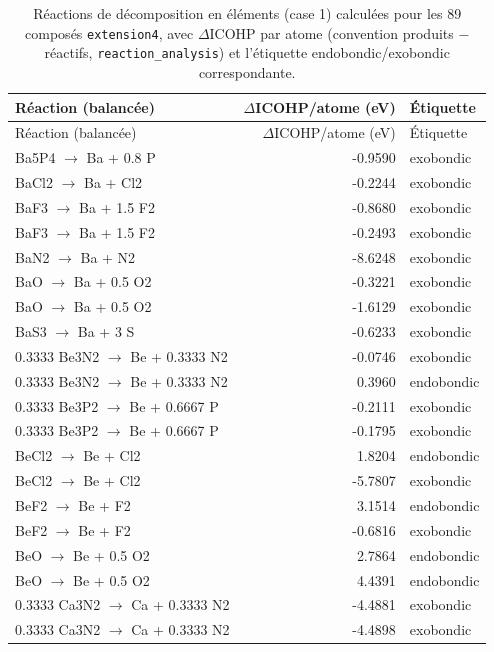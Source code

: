 \begin{longtable}{@{}lrl@{}}
\caption{Réactions de décomposition en éléments (case 1) calculées pour les 89 composés \texttt{extension4}, avec $\Delta$ICOHP par atome (convention produits $-$ réactifs, \texttt{reaction\_analysis}) et l'étiquette endobondic/exobondic correspondante.}\\
\toprule
Réaction (balancée) & $\Delta$ICOHP/atome (eV) & Étiquette \\
\midrule
\endfirsthead
\toprule
Réaction (balancée) & $\Delta$ICOHP/atome (eV) & Étiquette \\
\midrule
\endhead
\bottomrule
\endfoot
0.2 Ba5P4 $\rightarrow$ Ba + 0.8 P & -0.9590 & exobondic \\
BaCl2 $\rightarrow$ Ba + Cl2 & -0.2244 & exobondic \\
BaF3 $\rightarrow$ Ba + 1.5 F2 & -0.8680 & exobondic \\
BaF3 $\rightarrow$ Ba + 1.5 F2 & -0.2493 & exobondic \\
BaN2 $\rightarrow$ Ba + N2 & -8.6248 & exobondic \\
BaO $\rightarrow$ Ba + 0.5 O2 & -0.3221 & exobondic \\
BaO $\rightarrow$ Ba + 0.5 O2 & -1.6129 & exobondic \\
BaS3 $\rightarrow$ Ba + 3 S & -0.6233 & exobondic \\
0.3333 Be3N2 $\rightarrow$ Be + 0.3333 N2 & -0.0746 & exobondic \\
0.3333 Be3N2 $\rightarrow$ Be + 0.3333 N2 & 0.3960 & endobondic \\
0.3333 Be3P2 $\rightarrow$ Be + 0.6667 P & -0.2111 & exobondic \\
0.3333 Be3P2 $\rightarrow$ Be + 0.6667 P & -0.1795 & exobondic \\
BeCl2 $\rightarrow$ Be + Cl2 & 1.8204 & endobondic \\
BeCl2 $\rightarrow$ Be + Cl2 & -5.7807 & exobondic \\
BeF2 $\rightarrow$ Be + F2 & 3.1514 & endobondic \\
BeF2 $\rightarrow$ Be + F2 & -0.6816 & exobondic \\
BeO $\rightarrow$ Be + 0.5 O2 & 2.7864 & endobondic \\
BeO $\rightarrow$ Be + 0.5 O2 & 4.4391 & endobondic \\
0.3333 Ca3N2 $\rightarrow$ Ca + 0.3333 N2 & -4.4881 & exobondic \\
0.3333 Ca3N2 $\rightarrow$ Ca + 0.3333 N2 & -4.4898 & exobondic \\

\end{longtable}
